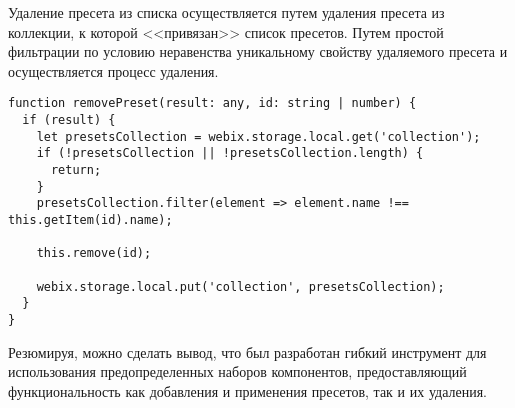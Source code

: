 Удаление пресета из списка осуществляется путем удаления пресета из коллекции, к которой <<привязан>> список пресетов. Путем простой фильтрации по условию неравенства уникальному свойству удаляемого пресета и осуществляется процесс удаления.

\begin{lstlisting}
function removePreset(result: any, id: string | number) {
  if (result) {
    let presetsCollection = webix.storage.local.get('collection');
    if (!presetsCollection || !presetsCollection.length) {
      return;
    }
    presetsCollection.filter(element => element.name !== this.getItem(id).name);

    this.remove(id);

    webix.storage.local.put('collection', presetsCollection);
  }
}
\end{lstlisting}

Резюмируя, можно сделать вывод, что был разработан гибкий инструмент для использования предопределенных наборов компонентов, предоставляющий функциональность как добавления и применения пресетов, так и их удаления.